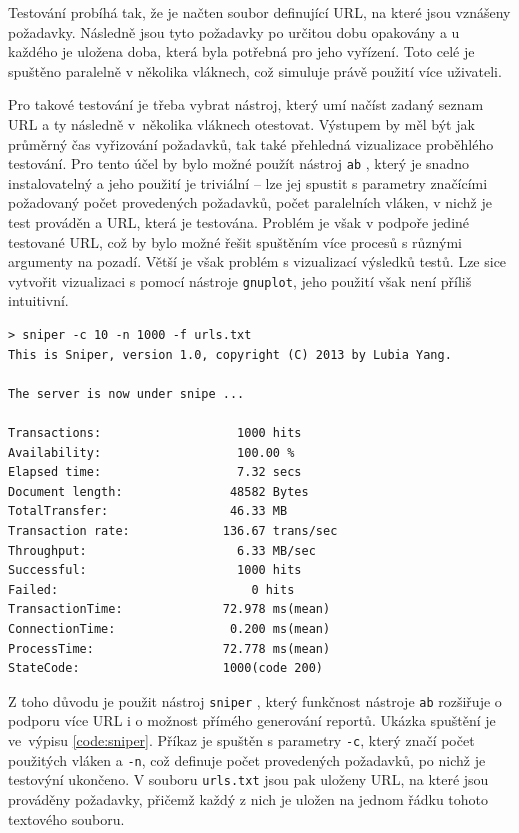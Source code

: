 \documentclass[FM,DP]{tulthesis}
\newenvironment{code}
    {\filbreak\captionsetup{type=listing}}{\filbreak}
\begin{document}
Testování probíhá tak, že je načten soubor definující URL, na které jsou vznášeny požadavky.
Následně jsou tyto požadavky po určitou dobu opakovány a u každého je uložena doba, která byla 
potřebná pro jeho vyřízení. Toto celé je spuštěno paralelně v několika vláknech, což simuluje 
právě použití více uživateli. 

Pro takové testování je třeba vybrat nástroj, který umí načíst zadaný seznam URL a
ty následně v~několika vláknech otestovat. Výstupem by měl být jak průměrný čas vyřizování
požadavků, tak také přehledná vizualizace proběhlého testování. Pro tento účel by bylo
možné použít nástroj \verb|ab| \cite{ab}, který je snadno instalovatelný a jeho použití
je triviální -- lze jej spustit s parametry značícími požadovaný počet provedených požadavků, 
počet paralelních vláken, v nichž je test prováděn a URL, která je testována. Problém je však 
v podpoře jediné testované URL, což by bylo možné řešit spuštěním více procesů s různými 
argumenty na pozadí. Větší je však problém s vizualizací výsledků testů. Lze sice vytvořit 
vizualizaci s pomocí nástroje \verb|gnuplot|, jeho použití však není příliš intuitivní.

\begin{code}
\captionsetup{singlelinecheck=false,justification=raggedright}
\label{code:sniper}
\begin{verbatim}
> sniper -c 10 -n 1000 -f urls.txt
This is Sniper, version 1.0, copyright (C) 2013 by Lubia Yang.

The server is now under snipe ...

Transactions:                   1000 hits
Availability:                   100.00 %
Elapsed time:                   7.32 secs
Document length:               48582 Bytes
TotalTransfer:                 46.33 MB
Transaction rate:             136.67 trans/sec
Throughput:                     6.33 MB/sec
Successful:                     1000 hits
Failed:                           0 hits
TransactionTime:              72.978 ms(mean)
ConnectionTime:                0.200 ms(mean)
ProcessTime:                  72.778 ms(mean)
StateCode:                    1000(code 200)
\end{verbatim}
\end{code}

Z toho důvodu je použit nástroj \verb|sniper| \cite{sniper}, který funkčnost nástroje \verb|ab|
rozšiřuje o podporu více URL i o možnost přímého generování reportů. Ukázka spuštění je ve~výpisu 
\ref{code:sniper}. Příkaz je spuštěn s parametry \verb|-c|, který značí počet použitých vláken a 
\verb|-n|, což definuje počet provedených požadavků, po nichž je testovýní ukončeno. V souboru 
\verb|urls.txt| jsou pak uloženy URL, na které jsou prováděny požadavky, přičemž každý z nich je 
uložen na jednom řádku tohoto textového souboru.
\end{document}
